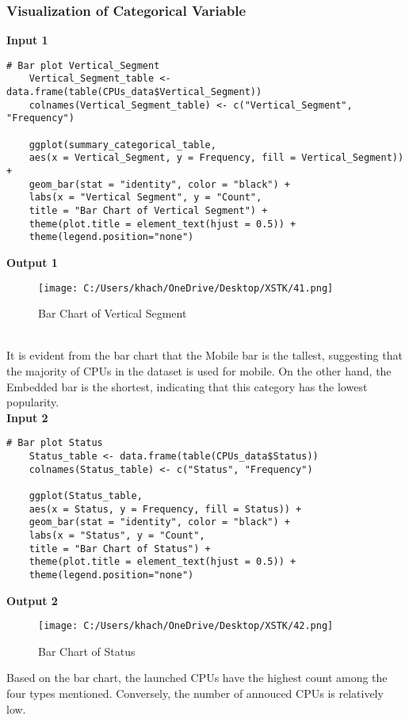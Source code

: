 \documentclass[a4paper]{article}
\begin{document}
	\subsubsection{Visualization of Categorical Variable}
	\textbf{Input 1}
	\begin{lstlisting}[frame=single, backgroundcolor=\color{gray!10}, breaklines=true, columns=fullflexible]
	# Bar plot Vertical_Segment
	Vertical_Segment_table <- data.frame(table(CPUs_data$Vertical_Segment))
	colnames(Vertical_Segment_table) <- c("Vertical_Segment", "Frequency")
	
	ggplot(summary_categorical_table, 
	aes(x = Vertical_Segment, y = Frequency, fill = Vertical_Segment)) + 
	geom_bar(stat = "identity", color = "black") +
	labs(x = "Vertical Segment", y = "Count", 
	title = "Bar Chart of Vertical Segment") +
	theme(plot.title = element_text(hjust = 0.5)) +
	theme(legend.position="none")
	\end{lstlisting}
	\textbf{Output 1}\\
	\begin{figure}[htbp]
		\centering
		\begin{adjustbox}{width=0.7\textwidth, frame}
			\texttt{[image: C:/Users/khach/OneDrive/Desktop/XSTK/41.png]}
		\end{adjustbox}
		\captionsetup{justification=centering}
		\vspace{0.5cm}
		\caption{Bar Chart of Vertical Segment}
	\end{figure}\\
	It is evident from the bar chart that the Mobile bar is the tallest, suggesting that the majority of CPUs in the dataset is used for mobile. On the other hand, the Embedded bar is the shortest, indicating that this category has the lowest popularity.\\
	\textbf{Input 2}
	\begin{lstlisting}[frame=single, backgroundcolor=\color{gray!10}, breaklines=true, columns=fullflexible]
	# Bar plot Status
	Status_table <- data.frame(table(CPUs_data$Status))
	colnames(Status_table) <- c("Status", "Frequency")
	
	ggplot(Status_table, 
	aes(x = Status, y = Frequency, fill = Status)) + 
	geom_bar(stat = "identity", color = "black") +
	labs(x = "Status", y = "Count", 
	title = "Bar Chart of Status") +
	theme(plot.title = element_text(hjust = 0.5)) +
	theme(legend.position="none")
	\end{lstlisting}
	\textbf{Output 2}
	\begin{figure}[htbp]
		\centering
		\begin{adjustbox}{width=0.7\textwidth, frame}
			\texttt{[image: C:/Users/khach/OneDrive/Desktop/XSTK/42.png]}
		\end{adjustbox}
		\captionsetup{justification=centering}
		\vspace{0.5cm}
		\caption{Bar Chart of Status}
	\end{figure}
	\newpage
	Based on the bar chart, the launched CPUs have the highest count among the four types mentioned. Conversely, the number of annouced CPUs is relatively low.
\end{document}
